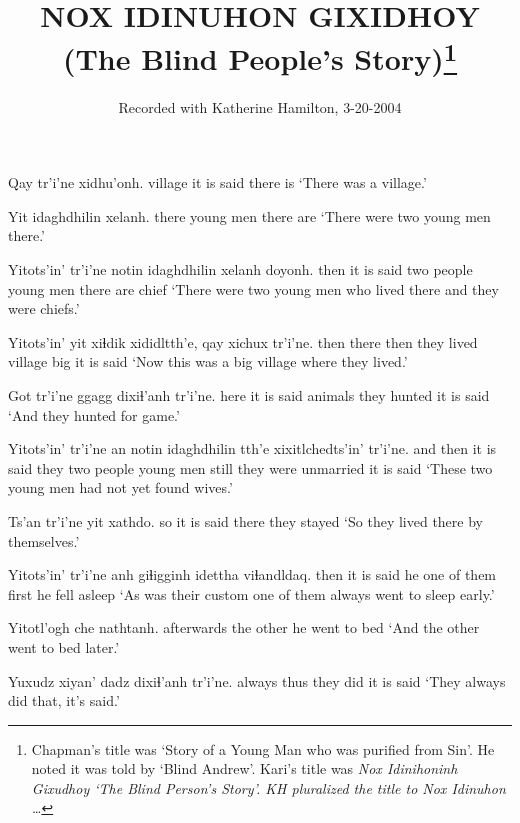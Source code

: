 \documentclass[12pt]{article}
\begin{document}
\title{NOX IDINUHON GIXIDHOY \\
(The Blind People's Story)\footnote{Chapman's title was `Story of a Young Man who was purified from Sin'. He noted it was told by `Blind Andrew'. Kari's title was \em Nox Idinihoninh Gixudhoy \em `The Blind Person's Story'. KH pluralized the title to \em Nox Idinuhon \ldots}}

\author{Recorded with Katherine Hamilton, 3-20-2004}
\date{}

\maketitle

\gll Qay  tr'i'ne xidhu'onh.
village {it is said} {there is}
\glt `There was a village.'
\glend

\gll Yit idaghdhilin xelanh.
there {young men}  {there are} 
\glt `There were two young men there.'
\glend

\gll Yitots'in' tr'i'ne notin idaghdhilin xelanh doyonh.
then  {it is said} {two people} {young men}  {there are} chief
\glt `There were two young men who lived there and they were chiefs.'
\glend

\gll Yitots'in' yit xiɬdik  xididltth'e, qay  xichux tr'i'ne.
then  there then  {they lived} village  big  {it is said}
\glt `Now this was a big village where they lived.'
\glend

\gll Got tr'i'ne ggagg  dixiɬ'anh tr'i'ne.
here {it is said} animals {they hunted}  {it is said}
\glt `And they hunted for game.'
\glend

\gll Yitots'in' tr'i'ne an notin idaghdhilin tth'e xixitlchedts'in' tr'i'ne.
{and then} {it is said} they {two people} {young men}  still {they were unmarried} {it is said}
\glt `These two young men had not yet found wives.'
\glend

\gll Ts'an tr'i'ne yit xathdo.
so {it is said} there {they stayed}
\glt `So they lived there by themselves.'
\glend

\gll Yitots'in' tr'i'ne anh giɬigginh idettha viɬandldaq.
then  {it is said} he {one of them} first {he fell asleep}
\glt `As was their custom one of them always went to sleep early.'
\glend

\gll Yitotl'ogh che  nathtanh.
afterwards {the other} {he went to bed}
\glt `And the other went to bed later.'
\glend

\gll Yuxudz  xiyan' dadz dixiɬ'anh tr'i'ne.
always  thus  they did {it is said}
\glt `They always did that, it's said.'
\glend
\end{document}
